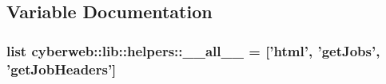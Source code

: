 \subsection{\-Variable \-Documentation}
\hypertarget{namespacecyberweb_1_1lib_1_1helpers_acbf58b845a485d1c983d79dd3d5e5a07}{
\subsubsection[{\-\_\-\-\_\-all\-\_\-\-\_\-}]{\setlength{\rightskip}{0pt plus 5cm}list {\bf cyberweb\-::lib\-::helpers\-::\-\_\-\-\_\-all\-\_\-\-\_\-} = \mbox{[}'html', '{\bf get\-Jobs}', '{\bf get\-Job\-Headers}'\mbox{]}}}\label{namespacecyberweb_1_1lib_1_1helpers_acbf58b845a485d1c983d79dd3d5e5a07}
